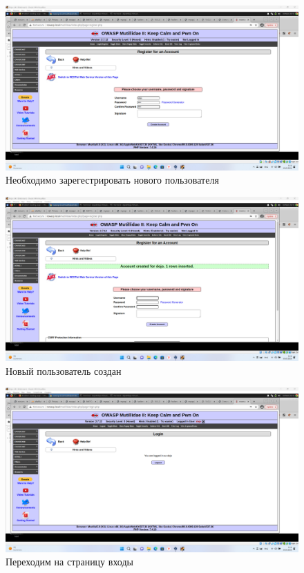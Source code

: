 \documentclass[a4paper]{article}
\begin{document}
  \begin{figure}[H]
    \centering
    \includegraphics[width=\textwidth]{Screenshot_19}
    \caption{Необходимо зарегестрировать нового пользователя}
  \end{figure}

  \begin{figure}[H]
    \centering
    \includegraphics[width=\textwidth]{Screenshot_20}
    \caption{Новый пользователь создан}
  \end{figure}

  \begin{figure}[H]
    \centering
    \includegraphics[width=\textwidth]{Screenshot_21}
    \caption{Переходим на страницу входы}
  \end{figure}
\end{document}
